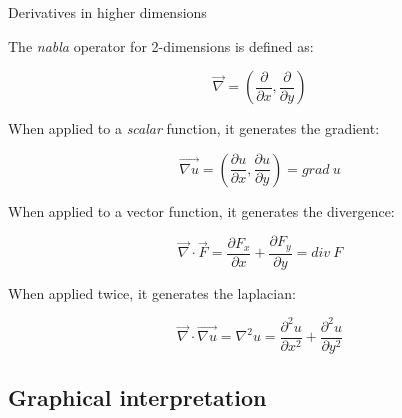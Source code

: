 \documentclass{beamer}
\begin{document}
  \begin{frame}{Derivatives in higher dimensions}

    The \textit{nabla} operator for 2-dimensions is defined as:

    \begin{displaymath}
    \vec \nabla = \left( \frac{\partial}{\partial x}, \frac{\partial}{\partial y} \right) 
    \end{displaymath}

    \pause

    When applied to a \textit{scalar} function, it generates the gradient:

    \begin{displaymath}
    \vec {\nabla u}  = \left( \frac{\partial u}{\partial x}, \frac{\partial u}{\partial y} \right) = grad \ u
    \end{displaymath}

    \pause

    When applied to a vector function, it generates the divergence:

    \begin{displaymath}
    \vec \nabla \cdot \vec F = \frac{\partial F_x}{\partial x} + \frac{\partial F_y}{\partial y} = div \ F
    \end{displaymath}

    \pause

    When applied twice, it generates the laplacian:

    \begin{displaymath}
    \vec \nabla \cdot \vec {\nabla u}  = \nabla^2 u = \frac{\partial^2 u}{\partial x^2} + \frac{\partial^2 u}{\partial y^2}
    \end{displaymath}

  \end{frame}

\subsection{Graphical interpretation}
\end{document}
